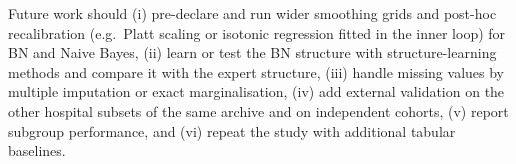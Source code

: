 \documentclass[conference]{IEEEtran}
\begin{document}
Future work should (i) pre-declare and run wider smoothing grids and post-hoc recalibration (e.g.\ Platt scaling or isotonic regression fitted in the inner loop) for BN and Naive Bayes, (ii) learn or test the BN structure with structure-learning methods and compare it with the expert structure, (iii) handle missing values by multiple imputation or exact marginalisation, (iv) add external validation on the other hospital subsets of the same archive and on independent cohorts, (v) report subgroup performance, and (vi) repeat the study with additional tabular baselines.



\end{document}
